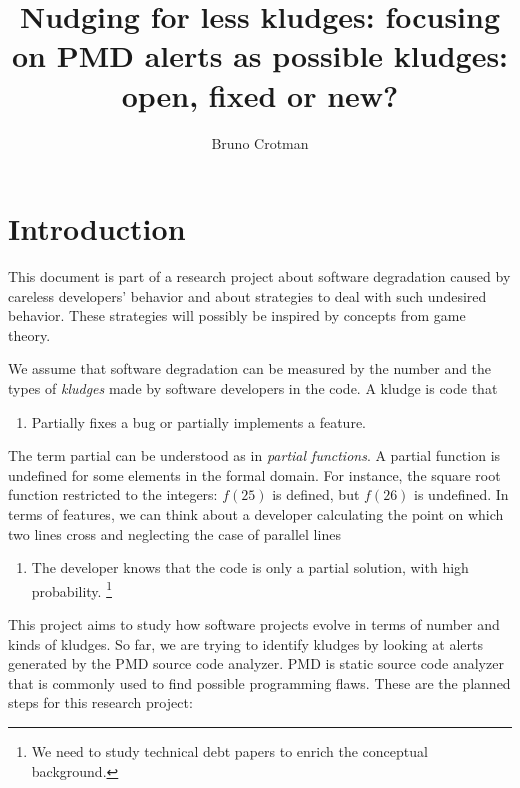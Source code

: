\documentclass[
]{article}
\title{Nudging for less kludges: focusing on PMD alerts as possible kludges:
open, fixed or new?}
\author{Bruno Crotman}
\date{}
\providecommand{\tightlist}{%
  \setlength{\itemsep}{0pt}\setlength{\parskip}{0pt}}
\begin{document}
\maketitle

{
\setcounter{tocdepth}{3}
\tableofcontents
}
\small

\normalsize

\section{Introduction}\label{intro}

This document is part of a research project about software degradation
caused by careless developers' behavior and about strategies to deal
with such undesired behavior. These strategies will possibly be inspired
by concepts from game theory.

We assume that software degradation can be measured by the number and
the types of \textit{kludges} made by software developers in the code. 
A kludge is code that

\begin{enumerate}
\def\labelenumi{\arabic{enumi}.}
\tightlist
\item
  Partially fixes a bug or partially implements a feature.
\end{enumerate}

\setlength{\parindent}{1.2cm}
\hangindent=1.2cm
The term partial can be understood as in \textit{partial functions}. A
partial function is undefined for some elements in the formal domain.
For instance, the square root function restricted to the integers:
\(f(25)\) is defined, but \(f(26)\) is undefined. In terms of features,
we can think about a developer calculating the point on which two lines
cross and neglecting the case of parallel lines

\begin{enumerate}
\def\labelenumi{\arabic{enumi}.}
\setcounter{enumi}{1}
\tightlist
\item
  The developer knows that the code is only a partial solution, with
  high probability. \footnote{We need to study technical debt papers
  to enrich the conceptual background.}
\end{enumerate}

This project aims to study how software projects evolve in terms of number
and kinds of kludges. So far, we are trying to identify kludges by looking 
at alerts generated by the PMD source code analyzer. PMD is static source 
code analyzer that is commonly used to find possible programming flaws. 
These are the planned steps for this research project:
\end{document}
